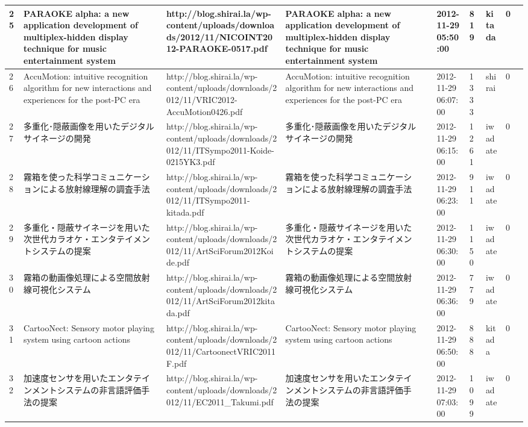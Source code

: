 \begin{longtable}{|l|l|l|l|l|l|l|l|l|l|}
25 & PARAOKE alpha: a new application development of multiplex-hidden display technique for music entertainment system & http://blog.shirai.la/wp-content/uploads/downloads/2012/11/NICOINT2012-PARAOKE-0517.pdf & PARAOKE alpha: a new application development of multiplex-hidden display technique for music entertainment system &  & 2012-11-29 05:50:00 & 819 & kitada & 0 &  \\ \hline 
26 & AccuMotion: intuitive recognition algorithm for new interactions and experiences for the post-PC era & http://blog.shirai.la/wp-content/uploads/downloads/2012/11/VRIC2012-AccuMotion0426.pdf & AccuMotion: intuitive recognition algorithm for new interactions and experiences for the post-PC era &  & 2012-11-29 06:07:00 & 1333 & shirai & 0 &  \\ \hline 
27 & 多重化･隠蔽画像を用いたデジタルサイネージの開発 & http://blog.shirai.la/wp-content/uploads/downloads/2012/11/ITSympo2011-Koide-0215YK3.pdf & 多重化･隠蔽画像を用いたデジタルサイネージの開発 &  & 2012-11-29 06:15:00 & 1261 & iwadate & 0 &  \\ \hline 
28 & 霧箱を使った科学コミュニケーションによる放射線理解の調査手法 & http://blog.shirai.la/wp-content/uploads/downloads/2012/11/ITSympo2011-kitada.pdf & 霧箱を使った科学コミュニケーションによる放射線理解の調査手法 &  & 2012-11-29 06:23:00 & 911 & iwadate & 0 &  \\ \hline 
29 & 多重化・隠蔽サイネージを用いた次世代カラオケ・エンタテイメントシステムの提案 & http://blog.shirai.la/wp-content/uploads/downloads/2012/11/ArtSciForum2012Koide.pdf & 多重化・隠蔽サイネージを用いた次世代カラオケ・エンタテイメントシステムの提案 &  & 2012-11-29 06:30:00 & 1150 & iwadate & 0 &  \\ \hline 
30 & 霧箱の動画像処理による空間放射線可視化システム & http://blog.shirai.la/wp-content/uploads/downloads/2012/11/ArtSciForum2012kitada.pdf & 霧箱の動画像処理による空間放射線可視化システム &  & 2012-11-29 06:36:00 & 779 & iwadate & 0 &  \\ \hline 
31 & CartooNect: Sensory motor playing system using cartoon actions & http://blog.shirai.la/wp-content/uploads/downloads/2012/11/CartoonectVRIC2011F.pdf & CartooNect: Sensory motor playing system using cartoon actions &  & 2012-11-29 06:50:00 & 888 & kitada & 0 &  \\ \hline 
32 & 加速度センサを用いたエンタテインメントシステムの非言語評価手法の提案 & http://blog.shirai.la/wp-content/uploads/downloads/2012/11/EC2011\_Takumi.pdf & 加速度センサを用いたエンタテインメントシステムの非言語評価手法の提案 &  & 2012-11-29 07:03:00 & 1099 & iwadate & 0 &  \\ \hline 

\end{longtable}
